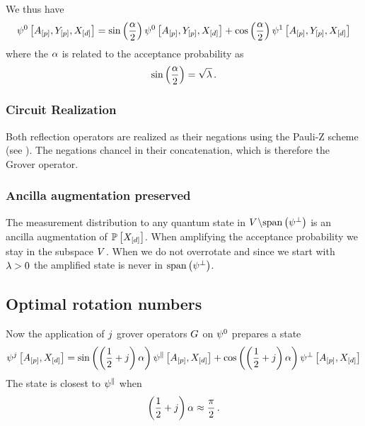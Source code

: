 We thus have
\begin{align*}
    \psi^{0}\left[A_{[p]},Y_{[p]},X_{[d]}\right]
    = \mathrm{sin}\left(\frac{\alpha}{2}\right) \psi^{0}\left[A_{[p]},Y_{[p]},X_{[d]}\right]
    + \mathrm{cos}\left(\frac{\alpha}{2}\right) \psi^{1}\left[A_{[p]},Y_{[p]},X_{[d]}\right]
\end{align*}
where the $\alpha$ is related to the acceptance probability as
\begin{align*}
    \mathrm{sin}\left(\frac{\alpha}{2}\right)
    = \sqrt{\lambda} \, .
\end{align*}



\subsubsection{Circuit Realization}

Both reflection operators are realized as their negations using the Pauli-Z scheme (see ).
The negations chancel in their concatenation, which is therefore the Grover operator.


\subsubsection{Ancilla augmentation preserved}

The measurement distribution to any quantum state in $V^{}\backslash\mathrm{span}\left(\psi^{\perp}\right)$ is an ancilla augmentation of $\mathbb{P}\left[X_{[d]}\right]$. %
When amplifying the acceptance probability we stay in the subspace $V^{}$.
When we do not overrotate and since we start with $\lambda>0$ the amplified state is never in $\mathrm{span}\left(\psi^{\perp}\right)$.




\subsection{Optimal rotation numbers}

Now the application of $j$ grover operators $G$ on $\psi^{0}$ prepares a state
\begin{align*}
    \psi^{j}\left[A_{[p]},X_{[d]}\right]
    = \mathrm{sin}\left(\left(\frac{1}{2}+j\right)\alpha\right) \psi^{\parallel}\left[A_{[p]},X_{[d]}\right]
    + \mathrm{cos}\left(\left(\frac{1}{2}+j\right)\alpha\right) \psi^{\perp}\left[A_{[p]},X_{[d]}\right]
\end{align*}
The state is closest to $\psi^{\parallel}$ when
\begin{align*}
    \left(\frac{1}{2}+j\right)
    \alpha \approx \frac{\pi}{2} \, .
\end{align*}

